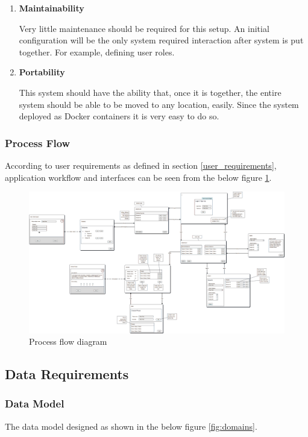\documentclass[10pt]{article}
\begin{document}
\begin{enumerate}
\item \textbf{Maintainability}

Very little maintenance should be required for this setup. An initial configuration will be
the only system required interaction after system is put together. For example, defining
user roles.


\item \textbf{Portability}

This system should have the ability that, once it is together, the entire system should be
able to be moved to any location, easily.  Since the system deployed as Docker containers
it is very easy to do so.

\end{enumerate}
\newpage


\subsubsection{Process Flow} \label{process_flow}
According to user requirements as defined in section \ref{user_requirements}, application
workflow and interfaces can be seen from the below figure \ref{fig:views}.

\begin{figure}[ht!]
    \centering
    \includegraphics[width=\paperwidth, angle=270]{diagram-views.png}
    \caption{Process flow diagram}
    \label{fig:views}
\end{figure}
\newpage


\subsection{Data Requirements} \label{data_requirements}


\subsubsection{Data Model} \label{data_models}
The data model designed as shown in the below figure \ref{fig:domains}.
\end{document}
